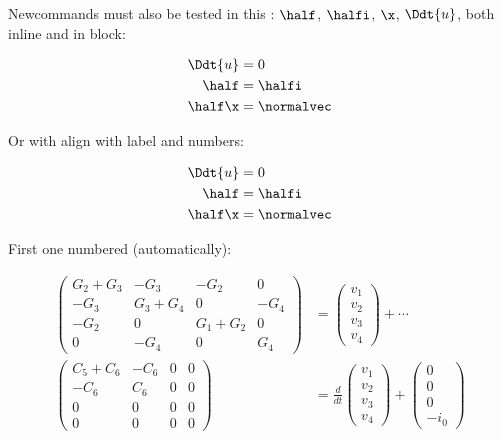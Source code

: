 \documentclass[%
oneside,                 %
final,                   %
10pt]{article}
\theoremstyle{definition}
\begin{document}
\begin{enumerate}
Newcommands must also be tested in this \report:
$\half$, $\halfi$, $\x$, $\Ddt{u}$,
both inline and in block:

\begin{align}
\Ddt{u} &= 0\nonumber
\\ 
\half &= \halfi\\ 
\half\x &= \normalvec
\end{align}

Or with align with label and numbers:

\begin{align}
\Ddt{u} &= 0
\label{aligneq1}
\\ 
\half &= \halfi\\ 
\half\x &= \normalvec
\label{aligneq2}
\end{align}


First one numbered (automatically):

\begin{align}
\begin{pmatrix}
G_2 + G_3 & -G_3 & -G_2 & 0 \\ 
-G_3 & G_3 + G_4 & 0 & -G_4 \\ 
-G_2 & 0 & G_1 + G_2 & 0 \\ 
0 & -G_4 & 0 & G_4
\end{pmatrix}
&=
\begin{pmatrix}
 v_1 \\ 
 v_2 \\ 
 v_3 \\ 
 v_4
\end{pmatrix}
+ \cdots \\ 
\begin{pmatrix}
 C_5 + C_6 & -C_6 & 0 & 0 \\ 
 -C_6 & C_6 & 0 & 0 \\ 
 0 & 0 & 0 & 0 \\ 
 0 & 0 & 0 & 0
\end{pmatrix}
  &= \frac{d}{dt}\begin{pmatrix}
 v_1 \\ 
 v_2 \\ 
 v_3 \\ 
 v_4
\end{pmatrix} +
\begin{pmatrix}
 0 \\ 
 0 \\ 
 0 \\ 
 -i_0
\end{pmatrix}
\nonumber
\end{align}


\end{enumerate}
\end{document}

